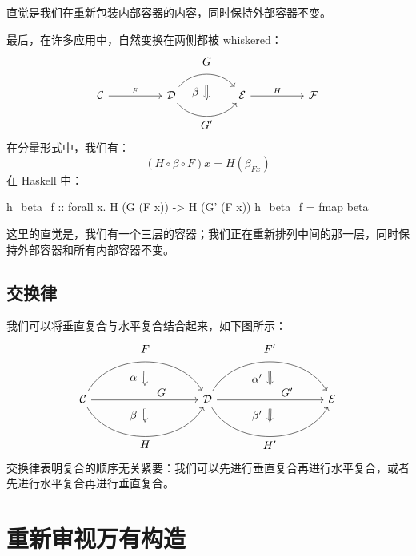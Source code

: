 \documentclass[DaoFP]{subfiles}
\begin{document}
直觉是我们在重新包装内部容器的内容，同时保持外部容器不变。

最后，在许多应用中，自然变换在两侧都被 whiskered：
\[
\begin{tikzcd}[column sep=huge]
\mathcal{C}
 \arrow[r, "F"]
 &
\mathcal{D}
  \arrow[bend left=50]{r}[name=U1, label=above:$G$]{}
  \arrow[bend right=50]{r}[name=D1, label=below:$G'$]{} 
 &
\mathcal{E}
  \arrow[shorten <=10pt,shorten >=10pt,Rightarrow,to path={(U1) -- node[label=left:$\beta$] {} (D1)}]{}
  \arrow[r, "H"]
 &
 \mathcal{F}
\end{tikzcd}
\]
在分量形式中，我们有：
\[ (H \circ \beta \circ F) x = H (\beta_{F x})\]
在 Haskell 中：
\begin{haskell}
h_beta_f :: forall x. H (G (F x)) -> H (G' (F x))
h_beta_f = fmap beta
\end{haskell}

这里的直觉是，我们有一个三层的容器；我们正在重新排列中间的那一层，同时保持外部容器和所有内部容器不变。

\subsection{交换律}

我们可以将垂直复合与水平复合结合起来，如下图所示：
\[
\begin{tikzcd}[column sep=huge]
\mathcal{C}
  \arrow[bend left=60]{rr}[name=U, label=above:$F$]{}
  \arrow[]{rr}[name=M, label={[xshift=15pt, yshift=-5pt]:$G$}]{} 
  \arrow[bend right=60]{rr}[name=D, label=below:$H$]{} 
 &&
\mathcal{D}
  \arrow[bend left=60]{rr}[name=U1, label=above:$F'$]{}
  \arrow[]{rr}[name=M1, label={[xshift=15pt, yshift=-5pt]:$G'$}]{} 
  \arrow[bend right=60]{rr}[name=D1, label=below:$H'$]{} 
&&
\mathcal{E}
  \arrow[shorten <=8pt, shorten >=8pt,Rightarrow, to path={(U) -- node[label=left:$\alpha$] {} (M)}]{}
  \arrow[shorten <=8pt, shorten >=8pt,Rightarrow, to path={(M) -- node[label=left:$\beta$] {} (D)}]{}
  \arrow[shorten <=8pt, shorten >=8pt,Rightarrow, to path={(U1) -- node[label=left:$\alpha'$] {} (M1)}]{}
  \arrow[shorten <=8pt, shorten >=8pt,Rightarrow, to path={(M1) -- node[label=left:$\beta'$] {} (D1)}]{}
\end{tikzcd}
\]
交换律表明复合的顺序无关紧要：我们可以先进行垂直复合再进行水平复合，或者先进行水平复合再进行垂直复合。




\section{重新审视万有构造}
\end{document}
